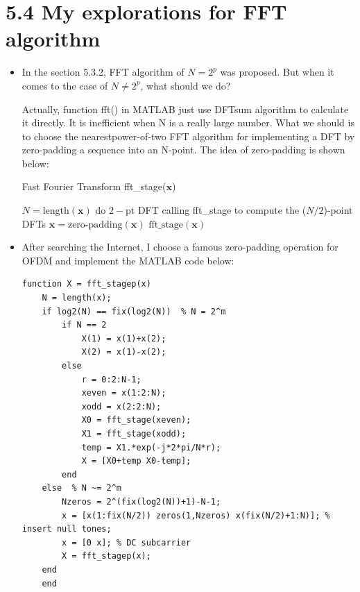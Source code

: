 \documentclass[onecolumn,oneside]{SUSTechHomework}
\begin{document}
\section*{5.4 My explorations for FFT algorithm}
\begin{itemize}
	\item In the section 5.3.2, FFT algorithm of $N=2^p$ was proposed. But when it comes to the case of  $N\neq 2^{p}$, what
	should we do?\par
	Actually, function fft() in MATLAB just use DFTsum algorithm to calculate it directly. It is inefficient when N is a really large number.
	What we should is to choose the nearestpower-of-two FFT algorithm for implementing a DFT by zero-padding a sequence into an N-point. The 
	idea of zero-padding is shown below:
	\begin{algorithm}[H]
		\caption{Fast Fourier Transform fft\_stage($\mathbf{x}$)}
		\label{alg2}
		\begin{algorithmic}
		\ENSURE $N=\text{length}(\mathbf{x})$
		\STATE do $2-$pt DFT
		\ELSE
		\STATE calling fft\_stage to compute the ($N/2$)-point DFTs
		\ENDIF
		\ELSE
		\STATE $\mathbf{x} = \text{zero-padding}(\mathbf{x})$
		\STATE $\text{fft\_stage}(\mathbf{x})$
		\ENDIF
	 	\end{algorithmic}
	\end{algorithm}
	\item After searching the Internet, I choose a famous zero-padding operation for OFDM and implement the MATLAB code below:
\begin{lstlisting}[title=\textbf{fft\_stagep.m}]
	function X = fft_stagep(x)
	N = length(x);  
	if log2(N) == fix(log2(N))  % N = 2^m
		if N == 2
			X(1) = x(1)+x(2);
			X(2) = x(1)-x(2);
		else
			r = 0:2:N-1;
			xeven = x(1:2:N);
			xodd = x(2:2:N);
			X0 = fft_stage(xeven);
			X1 = fft_stage(xodd);
			temp = X1.*exp(-j*2*pi/N*r);
			X = [X0+temp X0-temp]; 
		end
	else  % N ~= 2^m
		Nzeros = 2^(fix(log2(N))+1)-N-1;
		x = [x(1:fix(N/2)) zeros(1,Nzeros) x(fix(N/2)+1:N)]; % insert null tones;
		x = [0 x]; % DC subcarrier
		X = fft_stagep(x);      
	end
	end
\end{lstlisting}
\end{itemize}
\newpage
\end{document}
